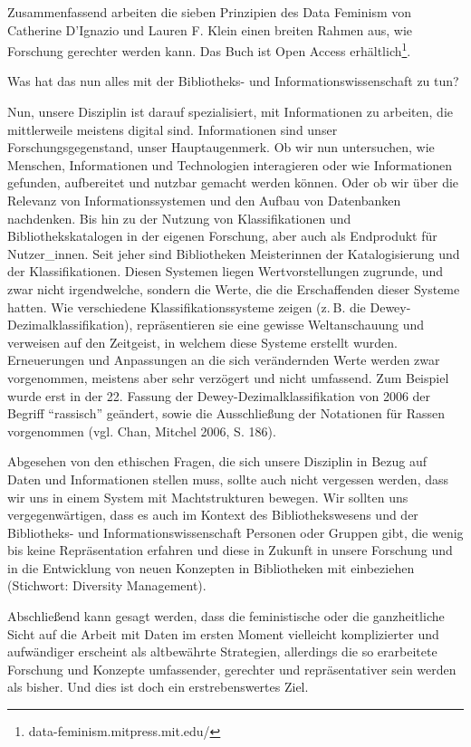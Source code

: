 \documentclass[a4paper,
fontsize=11pt,
oneside,
numbers=noperiodatend,
parskip=half-,
bibliography=totoc,
final
]{scrartcl}
\begin{document}
Zusammenfassend arbeiten die sieben Prinzipien des Data Feminism von
Catherine D'Ignazio und Lauren F. Klein einen breiten Rahmen aus, wie
Forschung gerechter werden kann. Das Buch ist Open Access
erhältlich\footnote{data-feminism.mitpress.mit.edu/}.

Was hat das nun alles mit der Bibliotheks- und Informationswissenschaft
zu tun?

Nun, unsere Disziplin ist darauf spezialisiert, mit Informationen zu
arbeiten, die mittlerweile meistens digital sind. Informationen sind
unser Forschungsgegenstand, unser Hauptaugenmerk. Ob wir nun
untersuchen, wie Menschen, Informationen und Technologien interagieren
oder wie Informationen gefunden, aufbereitet und nutzbar gemacht werden
können. Oder ob wir über die Relevanz von Informationssystemen und den
Aufbau von Datenbanken nachdenken. Bis hin zu der Nutzung von
Klassifikationen und Bibliothekskatalogen in der eigenen Forschung, aber
auch als Endprodukt für Nutzer\_innen. Seit jeher sind Bibliotheken
Meisterinnen der Katalogisierung und der Klassifikationen. Diesen
Systemen liegen Wertvorstellungen zugrunde, und zwar nicht irgendwelche,
sondern die Werte, die die Erschaffenden dieser Systeme hatten. Wie
verschiedene Klassifikationssysteme zeigen (z. B. die
Dewey-Dezimalklassifikation), repräsentieren sie eine gewisse
Weltanschauung und verweisen auf den Zeitgeist, in welchem diese Systeme
erstellt wurden. Erneuerungen und Anpassungen an die sich verändernden
Werte werden zwar vorgenommen, meistens aber sehr verzögert und nicht
umfassend. Zum Beispiel wurde erst in der 22. Fassung der
Dewey-Dezimalklassifikation von 2006 der Begriff \enquote{rassisch}
geändert, sowie die Ausschließung der Notationen für Rassen vorgenommen
(vgl. Chan, Mitchel 2006, S. 186).

Abgesehen von den ethischen Fragen, die sich unsere Disziplin in Bezug
auf Daten und Informationen stellen muss, sollte auch nicht vergessen
werden, dass wir uns in einem System mit Machtstrukturen bewegen. Wir
sollten uns vergegenwärtigen, dass es auch im Kontext des
Bibliothekswesens und der Bibliotheks- und Informationswissenschaft
Personen oder Gruppen gibt, die wenig bis keine Repräsentation erfahren
und diese in Zukunft in unsere Forschung und in die Entwicklung von
neuen Konzepten in Bibliotheken mit einbeziehen (Stichwort: Diversity
Management).

Abschließend kann gesagt werden, dass die feministische oder die
ganzheitliche Sicht auf die Arbeit mit Daten im ersten Moment vielleicht
komplizierter und aufwändiger erscheint als altbewährte Strategien,
allerdings die so erarbeitete Forschung und Konzepte umfassender,
gerechter und repräsentativer sein werden als bisher. Und dies ist doch
ein erstrebenswertes Ziel.
\end{document}
